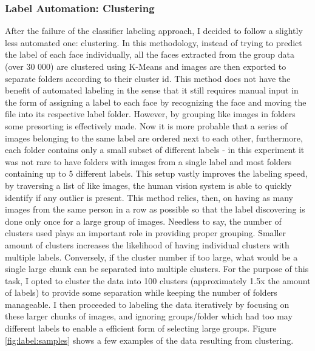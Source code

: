 \documentclass[11pt]{article}
\begin{document}
    \subsubsection{Label Automation: Clustering}\label{sec:face_labeling:clustering}
        After the failure of the classifier labeling approach, I decided to follow a slightly less automated one: clustering. In this methodology, instead of trying to predict the label of each face individually, all the faces extracted from the group data (over 30 000) are clustered using K-Means and images are then exported to separate folders according to their cluster id. This method does not have the benefit of automated labeling in the sense that it still requires manual input in the form of assigning a label to each face by recognizing the face and moving the file into its respective label folder. However, by grouping like images in folders some presorting is effectively made. Now it is more probable that a series of images belonging to the same label are ordered next to each other, furthermore, each folder contains only a small subset of different labels - in this experiment it was not rare to have folders with images from a single label and most folders containing up to 5 different labels. This setup vastly improves the labeling speed, by traversing a list of like images, the human vision system is able to quickly identify if any outlier is present. This method relies, then, on having as many images from the same person in a row as possible so that the label discovering is done only once for a large group of images. Needless to say, the number of clusters used plays an important role in providing proper grouping. Smaller amount of clusters increases the likelihood of having individual clusters with multiple labels. Conversely, if the cluster number if too large, what would be a single large chunk can be separated into multiple clusters. For the purpose of this task, I opted to cluster the data into 100 clusters (approximately 1.5x the amount of labels) to provide some separation while keeping the number of folders manageable. I then proceeded to labeling the data iteratively by focusing on these larger chunks of images, and ignoring groups/folder which had too may different labels to enable a efficient form of selecting large groups. Figure \ref{fig:label:samples} shows a few examples of the data resulting from clustering.
\end{document}
